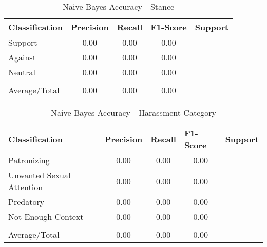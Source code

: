\begin{table}[H]
    \centering
    \caption{Naive-Bayes Accuracy - Stance}
    \begin{tabular}{m{4.5cm} m{1.5cm} m{1.1cm} m{1.6cm} m{1.5cm}}
        \toprule
        \rowcolor{White}\textbf{Classification} & {\textbf{Precision}} & {\textbf{Recall}} & {\textbf{F1-Score}} & {\textbf{Support}} \\
                \midrule
        Support & \multicolumn{1}{c}{0.00} & \multicolumn{1}{c}{0.00} & \multicolumn{1}{c}{0.00} & \multicolumn{1}{c}{ }\\
        Against & \multicolumn{1}{c}{0.00} & \multicolumn{1}{c}{0.00} & \multicolumn{1}{c}{0.00} & \multicolumn{1}{c}{ }\\
        Neutral & \multicolumn{1}{c}{0.00} & \multicolumn{1}{c}{0.00} & \multicolumn{1}{c}{0.00} & \multicolumn{1}{c}{ }\\
         & \multicolumn{1}{c}{} & \multicolumn{1}{c}{} & \multicolumn{1}{c}{} & \multicolumn{1}{c}{}\\
        \rowcolor{White}Average/Total & \multicolumn{1}{c}{0.00} & \multicolumn{1}{c}{0.00} & \multicolumn{1}{c}{0.00} & \multicolumn{1}{c}{ }\\

        \bottomrule
    \end{tabular}
\end{table}

\begin{table}[H]
    \centering
    \caption{Naive-Bayes Accuracy - Harassment Category}
    \begin{tabular}{m{4.5cm} m{1.5cm} m{1.1cm} m{1.6cm} m{1.5cm}}
        \toprule
        \rowcolor{White}\textbf{Classification} & {\textbf{Precision}} & {\textbf{Recall}} & {\textbf{F1-Score}} & {\textbf{Support}} \\
                \midrule
        Patronizing & \multicolumn{1}{c}{0.00} & \multicolumn{1}{c}{0.00} & \multicolumn{1}{c}{0.00} & \multicolumn{1}{c}{ }\\
        Unwanted Sexual Attention & \multicolumn{1}{c}{0.00} & \multicolumn{1}{c}{0.00} & \multicolumn{1}{c}{0.00} & \multicolumn{1}{c}{ }\\
        Predatory & \multicolumn{1}{c}{0.00} & \multicolumn{1}{c}{0.00} & \multicolumn{1}{c}{0.00} & \multicolumn{1}{c}{ }\\
        Not Enough Context & \multicolumn{1}{c}{0.00} & \multicolumn{1}{c}{0.00} & \multicolumn{1}{c}{0.00} & \multicolumn{1}{c}{ }\\
         & \multicolumn{1}{c}{} & \multicolumn{1}{c}{} & \multicolumn{1}{c}{} & \multicolumn{1}{c}{}\\
        \rowcolor{White}Average/Total & \multicolumn{1}{c}{0.00} & \multicolumn{1}{c}{0.00} & \multicolumn{1}{c}{0.00} & \multicolumn{1}{c}{ }\\

        \bottomrule
    \end{tabular}
\end{table}

